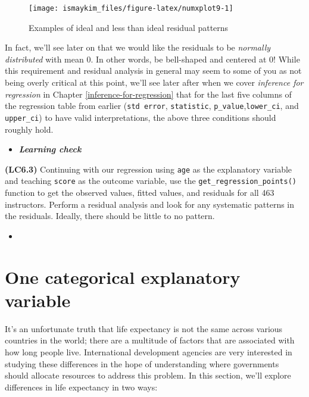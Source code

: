 \documentclass[12pt,]{krantz}
\newenvironment{rmdblock}[1]
  {\begin{shaded*}
  \begin{itemize}
  \renewcommand{\labelitemi}{
    \raisebox{-.7\height}[0pt][0pt]{
    }
  }
  \item
  }
  {
  \end{itemize}
  \end{shaded*}
  }
\newenvironment{learncheck}
  {\begin{rmdblock}{warning}}
  {\end{rmdblock}}
\begin{document}
\begin{figure}

{\centering \texttt{[image: ismaykim\_files/figure-latex/numxplot9-1]} 

}

\caption{Examples of ideal and less than ideal residual patterns}\label{fig:numxplot9}
\end{figure}

In fact, we'll see later on that we would like the residuals to be
\emph{normally distributed} with mean 0. In other words, be bell-shaped
and centered at 0! While this requirement and residual analysis in
general may seem to some of you as not being overly critical at this
point, we'll see later after when we cover \emph{inference for
regression} in Chapter \ref{inference-for-regression} that for the last
five columns of the regression table from earlier (\texttt{std\ error},
\texttt{statistic}, \texttt{p\_value},\texttt{lower\_ci}, and
\texttt{upper\_ci}) to have valid interpretations, the above three
conditions should roughly hold.

\begin{learncheck}
\textbf{\emph{Learning check}}
\end{learncheck}

\textbf{(LC6.3)} Continuing with our regression using \texttt{age} as
the explanatory variable and teaching \texttt{score} as the outcome
variable, use the \texttt{get\_regression\_points()} function to get the
observed values, fitted values, and residuals for all 463 instructors.
Perform a residual analysis and look for any systematic patterns in the
residuals. Ideally, there should be little to no pattern.

\begin{learncheck}

\end{learncheck}

\section{One categorical explanatory variable}\label{model2}

It's an unfortunate truth that life expectancy is not the same across
various countries in the world; there are a multitude of factors that
are associated with how long people live. International development
agencies are very interested in studying these differences in the hope
of understanding where governments should allocate resources to address
this problem. In this section, we'll explore differences in life
expectancy in two ways:
\end{document}
